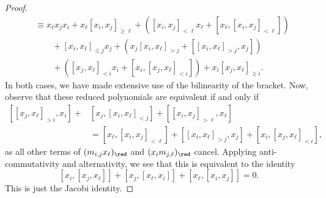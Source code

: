 \begin{proof}
\begin{align*}
&\equiv x_\ell x_jx_i+x_\ell[x_i,x_j]_{\ge \ell}+([x_i,x_j]_{<\ell}x_\ell+[x_\ell,[x_i,x_j]_{<\ell}])\\
&\qquad+[x_i,x_\ell]_{\le j}x_j+(x_j[x_i,x_\ell]_{>j}+[[x_i,x_\ell]_{>j},x_j])\\
&\qquad+([x_j,x_\ell]_{<i}x_i+[x_i,[x_j,x_\ell]_{<i}])+x_i[x_j,x_\ell]_{\ge i}.
\end{align*}
In both cases, we have made extensive use of the bilinearity of the bracket. Now, observe that these reduced polynomials are equivalent if and only if
\begin{equation}
\label{eqn:ueaconsistency}
\begin{split}
[[x_j,x_\ell]_{>i},x_i]+&[x_j,[x_i,x_\ell]_{<j}]+[[x_i,x_j]_{>\ell},x_\ell]\\
&=[x_\ell,[x_i,x_j]_{<\ell}]+[[x_i,x_\ell]_{>j},x_j]+[x_i,[x_j,x_\ell]_{<i}],
\end{split}
\end{equation}
as all other terms of $(m_{i,j}x_\ell)_\red$ and $(x_im_{j,\ell})_\red$ cancel. Applying anti-commutativity and alternativity, we see that this is equivalent to the identity
\begin{equation}
\label{eqn:jacobi}
[x_i,[x_j,x_\ell]]+[x_j,[x_\ell,x_i]]+[x_\ell,[x_i,x_j]]=0.
\end{equation}
This is just the Jacobi identity.
\end{proof}

